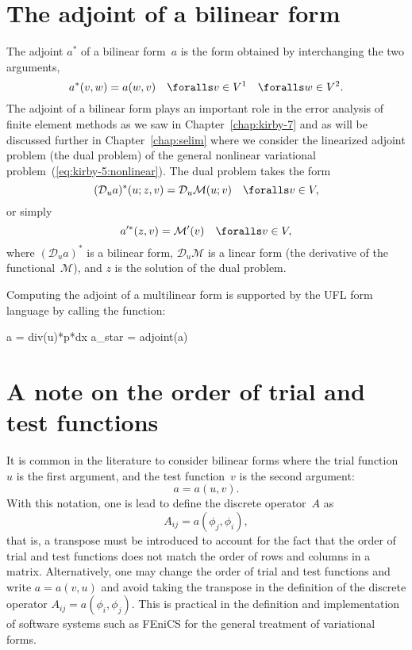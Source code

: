 \section{The adjoint of a bilinear form}

The adjoint $a^*$ of a bilinear form~$a$ is the form obtained by
interchanging the two arguments,
\begin{equation}
  a^*(v, w) = a(w, v) \quad \foralls v \in V^1 \quad \foralls w \in V^2.
\end{equation}
The adjoint of a bilinear form plays an important role in the error
analysis of finite element methods as we saw in
Chapter~\ref{chap:kirby-7} and as will be discussed further in
Chapter~\ref{chap:selim} where we consider the linearized adjoint
problem (the dual problem) of the general nonlinear variational
problem~(\ref{eq:kirby-5:nonlinear}). The dual problem takes the form
\begin{equation}
  (\mathcal{D}_u a)^* (u; z, v) = \mathcal{D}_u \mathcal{M} (u; v) \quad \foralls v \in V,
\end{equation}
or simply
\begin{equation}
  a'^* (z, v) = \mathcal{M}' (v) \quad \foralls v \in V,
\end{equation}
where $(\mathcal{D}_u a)^*$ is a bilinear form, $\mathcal{D}_u
\mathcal{M}$ is a linear form (the derivative of the
functional~$\mathcal{M}$), and $z$ is the solution of the dual
problem.

Computing the adjoint of a multilinear form is supported by the UFL
form language by calling the  function:
\begin{python}
  a = div(u)*p*dx
  a_star = adjoint(a)
\end{python}

\section{A note on the order of trial and test functions}

It is common in the literature to consider bilinear forms where the
trial function~$u$ is the first argument, and the test function~$v$ is
the second argument:
\begin{equation}
  a = a(u, v).
\end{equation}
With this notation, one is lead to define the discrete operator~$A$ as
\begin{equation}
  A_{ij} = a(\phi_j, \phi_i),
\end{equation}
that is, a transpose must be introduced to account for the fact that
the order of trial and test functions does not match the order of rows
and columns in a matrix. Alternatively, one may change the order of
trial and test functions and write $a = a(v, u)$ and avoid taking the
transpose in the definition of the discrete operator $A_{ij} =
a(\phi_i, \phi_j)$. This is practical in the definition and
implementation of software systems such as FEniCS for the general
treatment of variational forms.

